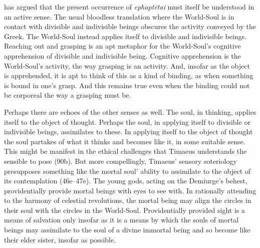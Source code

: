 \citet[134]{Betegh:2019fq} has argued that the present occurrence of \emph{ephaptētai} must itself be understood in an active sense. The usual bloodless translation where the World-Soul is in contact with divisible and indivisible beings obscures the activity conveyed by the Greek. The World-Soul instead applies itself to divisible and indivisible beings. Reaching out and grasping is an apt metaphor for the World-Soul's cognitive apprehension of divisible and indivisible being. Cognitive apprehension is the World-Soul's activity, the way grasping is an activity. And, insofar as the object is apprehended, it is apt to think of this as a kind of binding, as when something is bound in one's grasp. And this remains true even when the binding could not be corporeal the way a grasping must be. 

Perhaps there are echoes of the other senses as well. The soul, in thinking, applies itself to the object of thought. Perhaps the soul, in applying itself to divisible or indivisible beings, assimilates to these. In applying itself to the object of thought the soul partakes of what it thinks and becomes like it, in some suitable sense. This might be manifest in the ethical challenges that Timaeus understands the sensible to pose (90b). But more compellingly, Timaeus' sensory soteriology presupposes something like the mortal soul' ability to assimilate to the object of its contemplation (46e--47e). The young gods, acting on the Demiurge's behest, providentially provide mortal beings with eyes to see with. In rationally attending to the harmony of celestial revolutions, the mortal being may align the circles in their soul with the circles in the World-Soul. Providentially provided sight is a means of salvation only insofar as it is a means by which the souls of mortal beings may assimilate to the soul of a divine immortal being and so become like their elder sister, insofar as possible.


